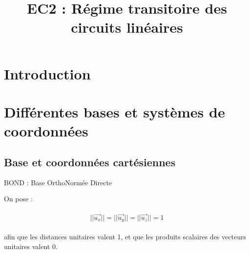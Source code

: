 \documentclass{article}
\title{EC2 : Régime transitoire des circuits linéaires}
\date{}
\begin{document}
\maketitle
\tableofcontents

\section*{Introduction}

\bigskip
\bigskip


\section[4]{Différentes bases et systèmes de coordonnées}

\subsection{Base et coordonnées cartésiennes}


BOND : Base OrthoNormée Directe

On pose :

\begin{align*}\begin{split}
||\overrightarrow{u_x}||=||\overrightarrow{u_y}||=||\overrightarrow{u_z}||=1
\end{split}\end{align*}

afin que les distances unitaires valent 1, et que les produits scalaires des vecteurs unitaires valent 0.
\end{document}
